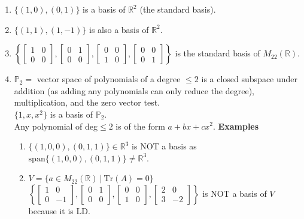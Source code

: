 \documentclass[]{article}
\begin{document}
		\begin{enumerate}
			\item $\{(1,0),(0,1)\}$ is a basis of $\mathbb{R}^2$ (the standard basis).
			\item $\{(1,1),(1,-1)\}$ is also a basis of $\mathbb{R}^2$.
			\item $\left\{\begin{bmatrix}{1}&{0}\\{0}&{0}\end{bmatrix},\begin{bmatrix}{0}&{1}\\{0}&{0}\end{bmatrix},\begin{bmatrix}{0}&{0}\\{1}&{0}\end{bmatrix},\begin{bmatrix}{0}&{0}\\{0}&{1}\end{bmatrix}\right\}$ is the standard basis of $M_{22}(\mathbb{R})$.
			\item $\mathbb{P}_2=$ vector space of polynomials of a degree $\le 2$ is a closed subspace under addition (as adding any polynomials can only reduce the degree), multiplication, and the zero vector test.\\
			$\{1,x,x^2\}$ is a basis of $\mathbb{P}_2$.\\
			Any polynomial of deg$\le 2$ is of the form $a+bx+cx^2$.
			{\bf Examples}
			\begin{enumerate}
				\item $\{(1,0,0),(0,1,1)\}\in\mathbb{R}^3$ is NOT a basis as $\text{span}\{(1,0,0),(0,1,1)\}\ne\mathbb{R}^3$.
				\item $V=\{a\in M_{22}(\mathbb{R})~|~\text{Tr}(A)=0\}$\\
				$\left\{\begin{bmatrix}{1}&{0}\\{0}&{-1}\end{bmatrix},\begin{bmatrix}{0}&{1}\\{0}&{0}\end{bmatrix},\begin{bmatrix}{0}&{0}\\{1}&{0}\end{bmatrix},\begin{bmatrix}{2}&{0}\\{3}&{-2}\end{bmatrix}\right\}$ is NOT a basis of $V$ because it is LD.\\

\end{enumerate}
\end{enumerate}
\end{document}
